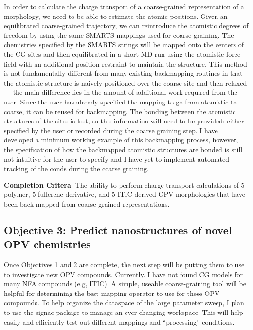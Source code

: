 In order to calculate the charge transport of a coarse-grained representation of a morphology, we need to be able to estimate the atomic positions.
Given an equilibrated coarse-grained trajectory, we can reintroduce the atomistic degrees of freedom by using the same SMARTS mappings used for coarse-graining.
The chemistries specified by the SMARTS strings will be mapped onto the centers of the CG sites and then equilibrated in a short MD run using the atomistic force field with an additional position restraint to maintain the structure. 
This method is not fundamentally different from many existing backmapping routines in that the atomistic structure is naively positioned over the coarse site and then relaxed --- the main difference lies in the amount of additional work required from the user\cite{Wassenaar2014b, MorphCT, Ruhle2009}.
Since the user has already specified the mapping to go from atomistic to coarse, it can be reused for backmapping.
The bonding between the atomistic structures of the sites is lost, so this information will need to be provided: either specified by the user or recorded during the coarse graining step.
I have developed a minimum working example of this backmapping process\cite{grits},
however, the specification of how the backmapped atomistic structures are bonded is still not intuitive for the user to specify and I have yet to implement automated tracking of the conds during the coarse graining.

\textbf{Completion Critera:} The ability to perform charge-transport calculations of 5 polymer, 5 fullerene-derivative, and 5 ITIC-derived OPV morphologies that have been back-mapped from coarse-grained representations.

\subsection*{Objective 3: Predict nanostructures of novel OPV chemistries}

Once Objectives 1 and 2 are complete, the next step will be putting them to use to investigate new OPV compounds. 
Currently, I have not found CG models for many NFA compounds (e.g, ITIC). %
A simple, useable coarse-graining tool will be helpful for determining the best mapping operator to use for these OPV compounds.
To help organize the dataspace of the large parameter sweep, I plan to use the signac package to manage an ever-changing workspace.
This will help easily and efficiently test out different mappings and ``processing'' conditions.

